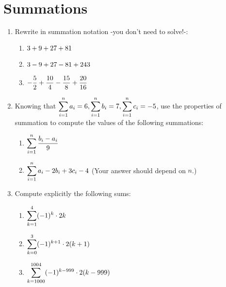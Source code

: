 \documentclass[10pt]{article}
\begin{document}
\section{Summations}
\begin{enumerate}

    
    \item Rewrite in summation notation -you don't need to solve!-:
    \begin{enumerate}
        \item $\displaystyle 3 + 9 + 27 + 81 $
        \item $\displaystyle 3 - 9 + 27 - 81 + 243$
        \item $\displaystyle -\frac{5}{2}+\frac{10}{4}-\frac{15}{8}+\frac{20}{16}$


    \end{enumerate}

    \item Knowing that $\displaystyle \sum_{i=1}^{n}a_i=6,\sum_{i=1}^{n}b_i=7,\sum_{i=1}^{n}c_i=-5$, use the properties of summation to compute the values of the following summations:
    \begin{enumerate}
        \item $\displaystyle \sum_{i=1}^n \frac{b_i-a_i}{9}$
        \item $\displaystyle \sum_{i=1}^n a_i-2b_i+3c_i-4$\hspace{10mm} (Your answer should depend on $n$.)
    \end{enumerate}
        \item Compute explicitly the following sums: 
    \begin{enumerate}
        \item $\displaystyle \sum_{k = 1}^4 (-1)^k\cdot 2k$
        \item $\displaystyle \sum_{k = 0}^3 (-1)^{k+1}\cdot 2(k+1)$
        \item $\displaystyle \sum_{k = 1000}^{1004} (-1)^{k-999} \cdot2(k-999)$
    \end{enumerate}
    \end{enumerate}




\newpage
\end{document}
